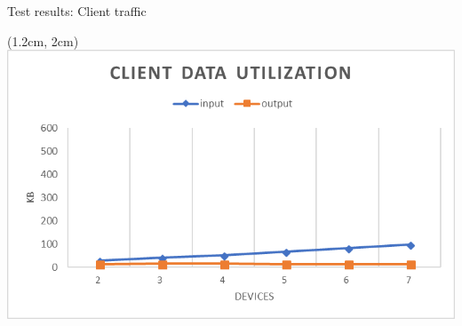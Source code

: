 \begin{frame}{Test results: Client traffic}
	
  \begin{textblock*}{5cm}(1.2cm, 2cm)
  	\includegraphics[scale=0.80]{../report/res/img/client_data_utilization}
  \end{textblock*}

\end{frame}
